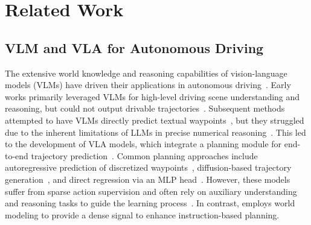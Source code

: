 \section{Related Work}
\label{sec: related_work}

\subsection{VLM and VLA for Autonomous Driving}
\label{sec: related_work_vlm}
The extensive world knowledge and reasoning capabilities of vision-language models (VLMs) have driven their applications in autonomous driving~\cite{lmdrive, drivemm, drivegpt4, gpt-driver}. 
Early works primarily leveraged VLMs for high-level driving scene understanding and reasoning, but could not output drivable trajectories~\cite{dolphins, drivemm, drivelm, nuscenes-qa, nuinstruct, nuplanqa, lingoqa, alphadrive}. 
Subsequent methods attempted to have VLMs directly predict textual waypoints~\cite{omnidrive, hint-ad, emma, openemma}, but they struggled due to the inherent limitations of LLMs in precise numerical reasoning~\cite{math-chatgpt, mathbert}. 
This led to the development of VLA models, which integrate a planning module for end-to-end trajectory prediction~\cite{senna, opendrivevla, orion}. 
Common planning approaches include autoregressive prediction of discretized waypoints~\cite{opendrivevla, diffvla, autovla}, diffusion-based trajectory generation~\cite{drivemoe, orion, recogdrive}, and direct regression via an MLP head~\cite{simlingo}. 
However, these models suffer from sparse action supervision and often rely on auxiliary understanding and reasoning tasks to guide the learning process~\cite{opendrivevla, orion, autovla}. 
In contrast, \model employs world modeling to provide a dense signal to enhance instruction-based planning.

